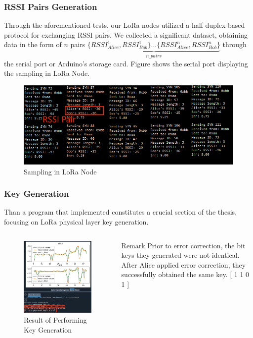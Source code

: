 \documentclass{beamer}
\begin{document}
\begin{frame}
  \frametitle{RSSI Pairs Generation}
  Through the aforementioned tests, our LoRa nodes utilized a half-duplex-based protocol for exchanging RSSI pairs. We collected a significant dataset, obtaining data in the form of \(n\) pairs \(\underbrace{\{RSSI_{Alice}^1, RSSI_{Bob}^1\}...\{RSSI_{Alice}^n, RSSI_{Bob}^n\}}_{n\_pairs}\) through the serial port or Arduino's storage card. Figure shows the serial port displaying the sampling in LoRa Node.
\begin{figure}
  \centering
  \includegraphics[width=0.67\linewidth]{../figures/sampling5.png}
  \caption{Sampling in LoRa Node}
  \label{sampling5}
\end{figure}
\end{frame}

\begin{frame}
  \frametitle{Key Generation}
  Than a program that implemented constitutes a crucial section of the thesis, focusing on LoRa physical layer key generation.
  \begin{columns}
  \begin{figure}
    \centering
    \includegraphics[width=0.82\linewidth]{../figures/physicalkeygen.png}
    \caption{Result of Performing Key Generation}
    \label{physicalkeygen}
  \end{figure}
  \begin{block}{Remark} 
    Prior to error correction, the bit keys they generated were not identical. After Alice applied error correction, they successfully obtained the same key.
    [ 1 1 0 1 ] 
  \end{block}
  
\end{columns}
\end{frame}
\end{document}
